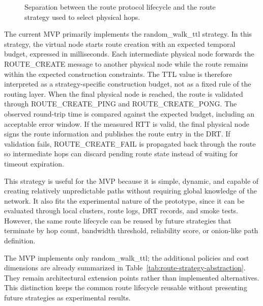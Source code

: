 \documentclass[12pt]{article}
\newcommand{\codebreak}[1]{{\footnotesize\ttfamily #1}}
\begin{document}
\begin{figure}[H]
{%
}
\caption{Separation between the route protocol lifecycle and the route strategy used to select physical hops.}
\label{fig:route-strategy-abstraction}
\end{figure}

The current MVP primarily implements the \codebreak{random\_\allowbreak{}walk\_\allowbreak{}ttl} strategy. In this strategy, the virtual node starts route creation with an expected temporal budget, expressed in milliseconds. Each intermediate physical node forwards the \codebreak{ROUTE\_\allowbreak{}CREATE} message to another physical node while the route remains within the expected construction constraints. The TTL value is therefore interpreted as a strategy-specific construction budget, not as a fixed rule of the routing layer. When the final physical node is reached, the route is validated through \codebreak{ROUTE\_\allowbreak{}CREATE\_\allowbreak{}PING} and \codebreak{ROUTE\_\allowbreak{}CREATE\_\allowbreak{}PONG}. The observed round-trip time is compared against the expected budget, including an acceptable error window. If the measured RTT is valid, the final physical node signs the route information and publishes the route entry in the DRT. If validation fails, \codebreak{ROUTE\_\allowbreak{}CREATE\_\allowbreak{}FAIL} is propagated back through the route so intermediate hops can discard pending route state instead of waiting for timeout expiration.

This strategy is useful for the MVP because it is simple, dynamic, and capable of creating relatively unpredictable paths without requiring global knowledge of the network. It also fits the experimental nature of the prototype, since it can be evaluated through local clusters, route logs, DRT records, and smoke tests. However, the same route lifecycle can be reused by future strategies that terminate by hop count, bandwidth threshold, reliability score, or onion-like path definition.

The MVP implements only \codebreak{random\_\allowbreak{}walk\_\allowbreak{}ttl}; the additional policies and cost dimensions are already summarized in Table~\ref{tab:route-strategy-abstraction}. They remain architectural extension points rather than implemented alternatives. This distinction keeps the common route lifecycle reusable without presenting future strategies as experimental results.
\end{document}
